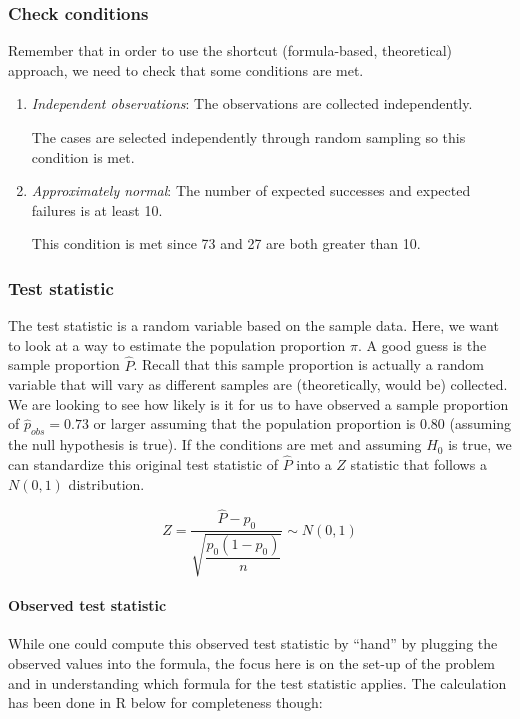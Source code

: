 \documentclass[]{tufte-book}
\begin{document}
\subsubsection{Check conditions}\label{check-conditions-1}

Remember that in order to use the shortcut (formula-based, theoretical)
approach, we need to check that some conditions are met.

\begin{enumerate}
\def\labelenumi{\arabic{enumi}.}
\item
  \emph{Independent observations}: The observations are collected
  independently.

  The cases are selected independently through random sampling so this
  condition is met.
\item
  \emph{Approximately normal}: The number of expected successes and
  expected failures is at least 10.

  This condition is met since 73 and 27 are both greater than 10.
\end{enumerate}

\subsubsection{Test statistic}\label{test-statistic-1}

The test statistic is a random variable based on the sample data. Here,
we want to look at a way to estimate the population proportion \(\pi\).
A good guess is the sample proportion \(\hat{P}\). Recall that this
sample proportion is actually a random variable that will vary as
different samples are (theoretically, would be) collected. We are
looking to see how likely is it for us to have observed a sample
proportion of \(\hat{p}_{obs} = 0.73\) or larger assuming that the
population proportion is 0.80 (assuming the null hypothesis is true). If
the conditions are met and assuming \(H_0\) is true, we can standardize
this original test statistic of \(\hat{P}\) into a \(Z\) statistic that
follows a \(N(0, 1)\) distribution.

\[ Z =\dfrac{ \hat{P} - p_0}{\sqrt{\dfrac{p_0(1 - p_0)}{n} }} \sim N(0, 1) \]

\paragraph{Observed test statistic}\label{observed-test-statistic-1}

While one could compute this observed test statistic by ``hand'' by
plugging the observed values into the formula, the focus here is on the
set-up of the problem and in understanding which formula for the test
statistic applies. The calculation has been done in R below for
completeness though:
\end{document}

